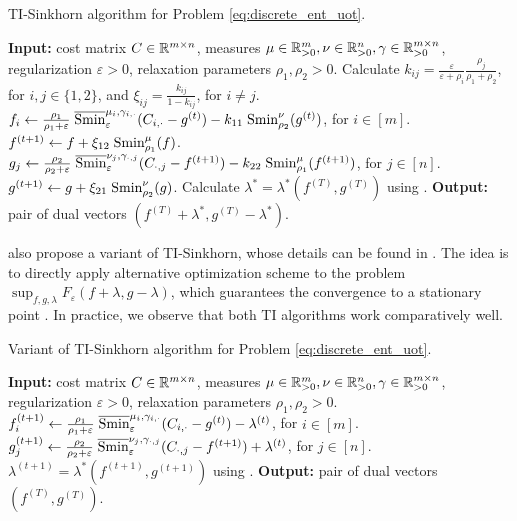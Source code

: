 \begin{algorithm}[t]
  \caption{TI-Sinkhorn algorithm for Problem \eqref{eq:discrete_ent_uot}.}
  \label{alg:TI_Sinkhorn}
\begin{algorithmic}[1]
  \STATE \textbf{Input:} cost matrix $C \in \mathbb R^{m \times n}$,
  measures $\mu \in \mathbb R^m_{> 0}, \nu \in \mathbb R^n_{> 0}, \gamma \in \mathbb R^{m \times n}_{> 0}$,
  regularization $\varepsilon > 0$, relaxation parameters $\rho_1, \rho_2 > 0$.
  \STATE Calculate $k_{ij} = \frac{\varepsilon}{\varepsilon + \rho_i}
  \frac{\rho_j}{\rho_1 + \rho_2}$,
  for $i, j \in \{ 1, 2\}$, and $\xi_{ij} = \frac{k_{ij}}{1 - k_{ij}}$, for $i \neq j$.
  \STATE $f_i \gets \frac{\rho_1}{\rho_1 + \varepsilon} \;
  \overline{\text{Smin}}^{\mu_i, \gamma_{i, \cdot}}_{\varepsilon}(C_{i, \cdot} - g^{(t)})
  - k_{11} \; \text{Smin}^{\nu}_{\rho_2}(g^{(t)})$, for $i \in [m]$.
  \STATE $f^{(t+1)} \gets f + \xi_{12} \; \text{Smin}^{\mu}_{\rho_1}(f)$.
  \STATE $g_j \gets \frac{\rho_2}{\rho_2 + \varepsilon} \;
  \overline{\text{Smin}}^{\nu_j, \gamma_{\cdot, j}}_{\varepsilon}(C_{\cdot, j} - f^{(t+1)})
  - k_{22} \; \text{Smin}^{\mu}_{\rho_1}(f^{(t+1)})$, for $j \in [n]$.
  \STATE $g^{(t+1)} \gets g + \xi_{21} \; \text{Smin}^{\nu}_{\rho_2}(g)$.
  \ENDFOR
  \STATE Calculate $\lambda^* = \lambda^*(f^{(T)}, g^{(T)})$ using .
  \STATE \textbf{Output:} pair of dual vectors $(f^{(T)} + \lambda^*, g^{(T)} - \lambda^*)$.
\end{algorithmic}
\end{algorithm}

\citet{Sejourne21} also propose a variant of TI-Sinkhorn, whose details can be found in
. The idea is to directly apply alternative optimization scheme
to the problem $\sup_{f, g, \lambda} F_{\varepsilon}(f + \lambda, g - \lambda)$, which guarantees
the convergence to a stationary point \citep{Tseng01}. In practice,
we observe that both TI algorithms work comparatively well.
\begin{algorithm}[t]
  \caption{Variant of TI-Sinkhorn algorithm for Problem \eqref{eq:discrete_ent_uot}.}
  \label{alg:TI_Sinkhorn_variant}
\begin{algorithmic}[1]
  \STATE \textbf{Input:} cost matrix $C \in \mathbb R^{m \times n}$,
  measures $\mu \in \mathbb R^m_{> 0}, \nu \in \mathbb R^n_{> 0}, \gamma \in \mathbb R^{m \times n}_{> 0}$,
  regularization $\varepsilon > 0$, relaxation parameters $\rho_1, \rho_2 > 0$.
  \STATE $f_i^{(t+1)} \gets \frac{\rho_1}{\rho_1 + \varepsilon} \;
  \overline{\text{Smin}}^{\mu_i, \gamma_{i, \cdot}}_{\varepsilon}(C_{i, \cdot} - g^{(t)})
  - \lambda^{(t)}$, for $i \in [m]$.
  \STATE $g_j^{(t+1)} \gets \frac{\rho_2}{\rho_2 + \varepsilon} \;
  \overline{\text{Smin}}^{\nu_j, \gamma_{\cdot, j}}_{\varepsilon}(C_{\cdot, j} - f^{(t+1)})
  + \lambda^{(t)}$, for $j \in [n]$.
  \STATE $\lambda^{(t+1)} = \lambda^*(f^{(t+1)}, g^{(t+1)})$ using .
  \ENDFOR
  \STATE \textbf{Output:} pair of dual vectors $(f^{(T)}, g^{(T)})$.
\end{algorithmic}
\end{algorithm}

